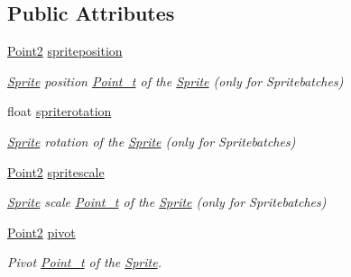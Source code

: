 \subsection*{Public Attributes}
\begin{DoxyCompactItemize}
\item 
\mbox{\label{class_sprite_a7f76c78f2f69d6cc0689bee7fbc2d57f}} 
\hyperlink{pointx_8h_aca903a92c8ced8823fea9fac7e23677a}{Point2} \hyperlink{class_sprite_a7f76c78f2f69d6cc0689bee7fbc2d57f}{spriteposition}
\begin{DoxyCompactList}\small\item\em \hyperlink{class_sprite}{Sprite} position \hyperlink{class_point__t}{Point\+\_\+t} of the \hyperlink{class_sprite}{Sprite} (only for Spritebatches) \end{DoxyCompactList}\item 
\mbox{\label{class_sprite_a6a28de683885ecffa2c5934cd0df330b}} 
float \hyperlink{class_sprite_a6a28de683885ecffa2c5934cd0df330b}{spriterotation}
\begin{DoxyCompactList}\small\item\em \hyperlink{class_sprite}{Sprite} rotation of the \hyperlink{class_sprite}{Sprite} (only for Spritebatches) \end{DoxyCompactList}\item 
\mbox{\label{class_sprite_a458d2b177ceb0b0ba4030b47d4e4cb39}} 
\hyperlink{pointx_8h_aca903a92c8ced8823fea9fac7e23677a}{Point2} \hyperlink{class_sprite_a458d2b177ceb0b0ba4030b47d4e4cb39}{spritescale}
\begin{DoxyCompactList}\small\item\em \hyperlink{class_sprite}{Sprite} scale \hyperlink{class_point__t}{Point\+\_\+t} of the \hyperlink{class_sprite}{Sprite} (only for Spritebatches) \end{DoxyCompactList}\item 
\mbox{\label{class_sprite_a8378b1b658e1fa4b364b499f7b52b820}} 
\hyperlink{pointx_8h_aca903a92c8ced8823fea9fac7e23677a}{Point2} \hyperlink{class_sprite_a8378b1b658e1fa4b364b499f7b52b820}{pivot}
\begin{DoxyCompactList}\small\item\em Pivot \hyperlink{class_point__t}{Point\+\_\+t} of the \hyperlink{class_sprite}{Sprite}. \end{DoxyCompactList}\item 

\end{DoxyCompactItemize}
